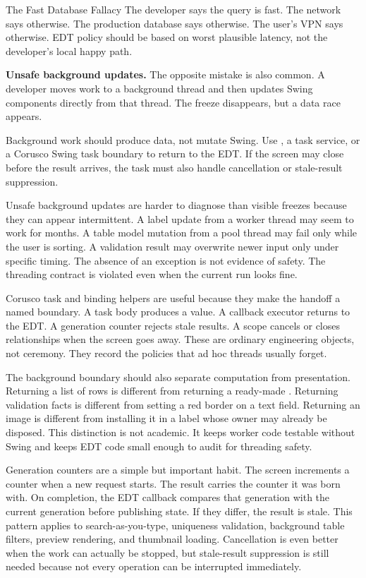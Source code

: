 \begin{pitfallbox}{The Fast Database Fallacy}
The developer says the query is fast. The network says otherwise. The production database says otherwise. The user's VPN says otherwise. EDT policy should be based on worst plausible latency, not the developer's local happy path.
\end{pitfallbox}

\textbf{Unsafe background updates.}
The opposite mistake is also common. A developer moves work to a background thread and then updates Swing components directly from that thread. The freeze disappears, but a data race appears.

Background work should produce data, not mutate Swing. Use , a task service, or a Corusco Swing task boundary to return to the EDT. If the screen may close before the result arrives, the task must also handle cancellation or stale-result suppression.

Unsafe background updates are harder to diagnose than visible freezes because
they can appear intermittent. A label update from a worker thread may seem to
work for months. A table model mutation from a pool thread may fail only while
the user is sorting. A validation result may overwrite newer input only under
specific timing. The absence of an exception is not evidence of safety. The
threading contract is violated even when the current run looks fine.

Corusco task and binding helpers are useful because they make the handoff a
named boundary. A task body produces a value. A callback executor returns to the
EDT. A generation counter rejects stale results. A scope cancels or closes
relationships when the screen goes away. These are ordinary engineering
objects, not ceremony. They record the policies that ad hoc threads usually
forget.

The background boundary should also separate computation from presentation.
Returning a list of rows is different from returning a ready-made
. Returning validation facts is different from setting a red border
on a text field. Returning an image is different from installing it in a label
whose owner may already be disposed. This distinction is not academic. It keeps
worker code testable without Swing and keeps EDT code small enough to audit for
threading safety.

Generation counters are a simple but important habit. The screen increments a
counter when a new request starts. The result carries the counter it was born
with. On completion, the EDT callback compares that generation with the current
generation before publishing state. If they differ, the result is stale. This
pattern applies to search-as-you-type, uniqueness validation, background table
filters, preview rendering, and thumbnail loading. Cancellation is even better
when the work can actually be stopped, but stale-result suppression is still
needed because not every operation can be interrupted immediately.


